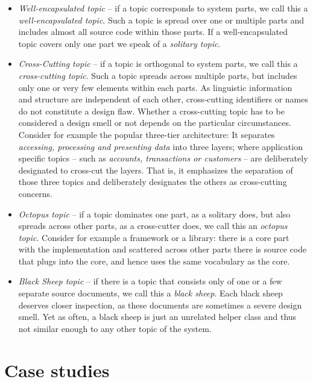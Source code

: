 \begin{itemize}
  \item \emph{Well-encapsulated topic} -- if a topic corresponds to system parts, we call this a \emph{well-encapsulated topic}. Such a topic is spread over one or multiple parts and includes almost all source code within those parts. If a well-encapsulated topic covers only one part we speak of a \emph{solitary topic}.

  \item \emph{Cross-Cutting topic} -- if a topic is orthogonal to system parts, we call this a \emph{cross-cutting topic}. Such a topic spreads across multiple parts, but includes only one or very few elements within each parts. As linguistic information and structure are independent of each other, cross-cutting identifiers or names do not constitute a design flaw. Whether a cross-cutting topic has to be considered a design smell or not depends on the particular circumstances. Consider for example the popular three-tier architecture: It separates \emph{accessing, processing \emph{and} presenting data} into three layers; where application specific topics -- such as \eg \emph{accounts, transactions \emph{or} customers} -- are deliberately designated to cross-cut the layers. That is, it emphasizes the separation of those three topics and deliberately designates the others as cross-cutting concerns.

 \item \emph{Octopus topic} -- if a topic dominates one part, as a solitary does, but also spreads across other parts, as a cross-cutter does, we call this an \emph{octopus topic}. Consider for example a framework or a library: there is a core part with the implementation and scattered across other parts there is source code that plugs into the core, and hence uses the same vocabulary as the core.

  \item \emph{Black Sheep topic} -- if there is a topic that consists only of one or a few separate source documents, we call this a \emph{black sheep}. Each black sheep deserves closer inspection, as these documents are sometimes a severe design smell. Yet as often, a black sheep is just an unrelated helper class and thus not similar enough to any other topic of the system.
\end{itemize}

\section{Case studies}\label{sec:validation}

